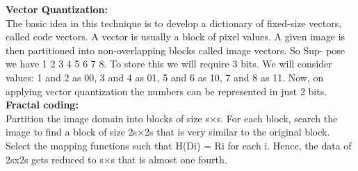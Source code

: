\documentclass[10pt,a4paper]{article}
\begin{document}
\textbf{Vector Quantization:}\\
The basic idea in this technique is to develop a dictionary of ﬁxed-size vectors, called code vectors. A vector is usually a block of pixel values. A given image is then partitioned into non-overlapping blocks called image vectors. So Sup- pose we have 1 2 3 4 5 6 7 8. To store this we will require 3 bits. We will consider values: 1 and 2 as 00, 3 and 4 as 01, 5 and 6 as 10, 7 and 8 as 11. Now, on applying vector quantization the numbers can be represented in just 2 bits.\\
\textbf{Fractal coding:}\\
Partition the image domain into blocks of size s×s. For each block, search the image to ﬁnd a block of size 2s×2s that is very similar to the original block. Select the mapping functions such that H(Di) = Ri  for each i. Hence, the data of 2sx2s gets reduced to s$\times$s that is almost one fourth.
 
\end{document}
